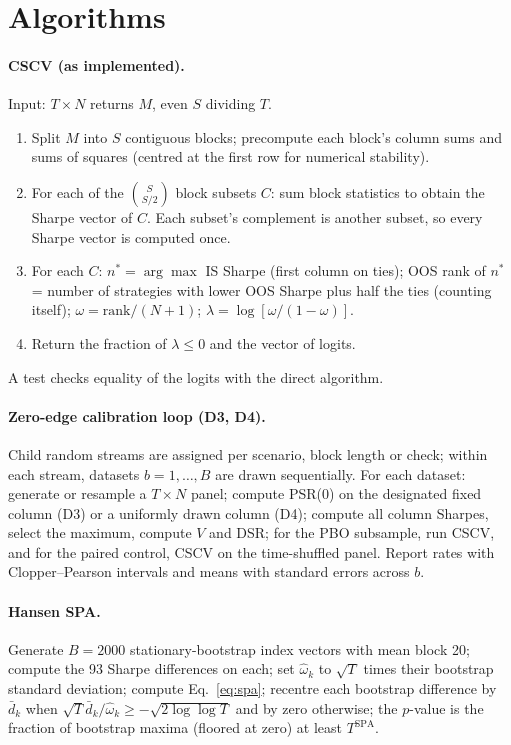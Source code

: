 \documentclass[11pt,a4paper]{article}
\theoremstyle{remark}
\begin{document}
\section{Algorithms}\label{app:algorithms}

\paragraph{CSCV (as implemented).} Input: $T\times N$ returns $M$, even $S$ dividing $T$.
\begin{enumerate}
\item Split $M$ into $S$ contiguous blocks; precompute each block's column sums and sums of squares (centred at the first row for numerical stability).
\item For each of the $\binom{S}{S/2}$ block subsets $C$: sum block statistics to obtain the Sharpe vector of $C$. Each subset's complement is another subset, so every Sharpe vector is computed once.
\item For each $C$: $n^\ast=\arg\max$ IS Sharpe (first column on ties); OOS rank of $n^\ast$ = number of strategies with lower OOS Sharpe plus half the ties (counting itself); $\omega=\text{rank}/(N+1)$; $\lambda=\log[\omega/(1-\omega)]$.
\item Return the fraction of $\lambda\le0$ and the vector of logits.
\end{enumerate}
A test checks equality of the logits with the direct algorithm.

\paragraph{Zero-edge calibration loop (D3, D4).} Child random streams are assigned per scenario, block length or check; within each stream, datasets $b=1,\dots,B$ are drawn sequentially. For each dataset: generate or resample a $T\times N$ panel; compute PSR(0) on the designated fixed column (D3) or a uniformly drawn column (D4); compute all column Sharpes, select the maximum, compute $V$ and DSR; for the PBO subsample, run CSCV, and for the paired control, CSCV on the time-shuffled panel. Report rates with Clopper--Pearson intervals and means with standard errors across $b$.

\paragraph{Hansen SPA.} Generate $B=2000$ stationary-bootstrap index vectors with mean block 20; compute the 93 Sharpe differences on each; set $\hat\omega_k$ to $\sqrt T$ times their bootstrap standard deviation; compute Eq.~\eqref{eq:spa}; recentre each bootstrap difference by $\bar d_k$ when $\sqrt T\bar d_k/\hat\omega_k\ge-\sqrt{2\log\log T}$ and by zero otherwise; the $p$-value is the fraction of bootstrap maxima (floored at zero) at least $T^{\mathrm{SPA}}$.
\end{document}
